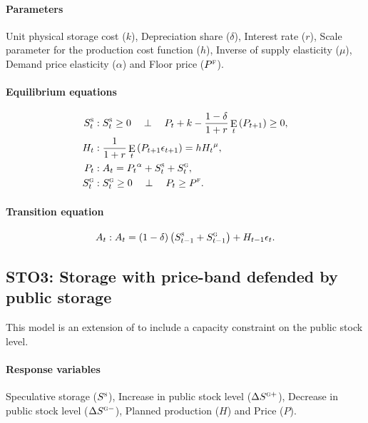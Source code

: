 \documentclass[11pt,fleqn]{article}
\DeclareMathOperator{\E}{E}
\newcommand{\Ss}{S^{\textsc{s}}}
\newcommand{\Sg}{S^{\textsc{g}}}
\newcommand{\PF}{P^{\textsc{f}}}
\newcommand{\CP}{\quad \perp \quad}
\newcommand{\dSp}[1]{\Delta S^{\textsc{g}+}_{#1}}
\newcommand{\dSm}[1]{\Delta S^{\textsc{g}-}_{#1}}
\begin{document}
\paragraph{Parameters}
\label{sec:parameters}

Unit physical storage cost ($k$), Depreciation share ($\delta$), Interest rate
($r$), Scale parameter for the production cost function ($h$), Inverse of supply
elasticity ($\mu$), Demand price elasticity ($\alpha$) and Floor price ($\PF$).

\paragraph{Equilibrium equations}
\label{sec:equil-equat}

\begin{align}
  \Ss_{t}&: \Ss_{t}\ge 0 \CP P_{t}+k-\frac{1-\delta}{1+r}\E_{t}\left(P_{t+1}\right)\ge 0,\\
  H_{t}&: \frac{1}{1+r}\E_{t}\left(P_{t+1}\epsilon_{t+1}\right)=h {H_{t}}^{\mu},\\
  P_{t}&: A_{t}={P_{t}}^{\alpha}+\Ss_{t}+\Sg_{t},\\
  \Sg_{t}&: \Sg_{t}\ge 0 \CP P_{t}\ge\PF.
\end{align}

\paragraph{Transition equation}
\label{sec:transition-equation}

\begin{equation}
  A_{t}: A_{t}=\left(1-\delta\right)\left(\Ss_{t-1}+\Sg_{t-1}\right)+H_{t-1}\epsilon_{t}.
\end{equation}

\subsection{STO3: Storage with price-band defended by public storage}
\label{sec:storage-with-price}

This model is an extension of \citet{Mira88} to include a capacity constraint on
the public stock level.

\paragraph{Response variables}
\label{sec:response-variables}

Speculative storage ($\Ss$), Increase in public stock level ($\dSp{}$), Decrease in
public stock level ($\dSm{}$), Planned production ($H$) and Price ($P$).
\end{document}
